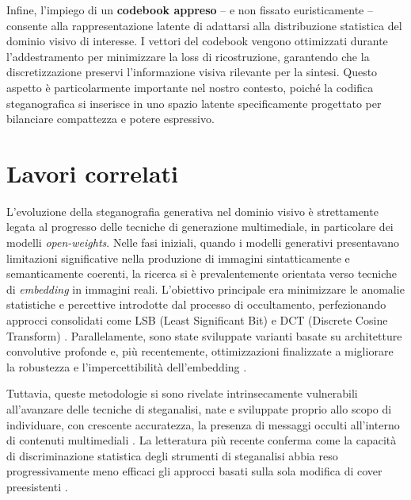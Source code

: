 Infine, l'impiego di un \textbf{codebook appreso} -- e non fissato euristicamente -- consente alla rappresentazione latente di adattarsi alla distribuzione statistica del dominio visivo di interesse. I vettori del codebook vengono ottimizzati durante l'addestramento per minimizzare la loss di ricostruzione, garantendo che la discretizzazione preservi l'informazione visiva rilevante per la sintesi. Questo aspetto è particolarmente importante nel nostro contesto, poiché la codifica steganografica si inserisce in uno spazio latente specificamente progettato per bilanciare compattezza e potere espressivo.


\section{Lavori correlati}

L'evoluzione della steganografia generativa nel dominio visivo è strettamente legata al progresso delle tecniche di generazione multimediale, in particolare dei modelli \emph{open-weights}. Nelle fasi iniziali, quando i modelli generativi presentavano limitazioni significative nella produzione di immagini sintatticamente e semanticamente coerenti, la ricerca si è prevalentemente orientata verso tecniche di \emph{embedding} in immagini reali. L'obiettivo principale era minimizzare le anomalie statistiche e percettive introdotte dal processo di occultamento, perfezionando approcci consolidati come LSB (Least Significant Bit) e DCT (Discrete Cosine Transform) \cite{baluja-2017}. Parallelamente, sono state sviluppate varianti basate su architetture convolutive profonde \cite{hu-2018, wu-2018} e, più recentemente, ottimizzazioni finalizzate a migliorare la robustezza e l'impercettibilità dell'embedding \cite{huang-2024, tan-2025, waheed-2024, wang-2025}.

Tuttavia, queste metodologie si sono rivelate intrinsecamente vulnerabili all'avanzare delle tecniche di steganalisi, nate e sviluppate proprio allo scopo di individuare, con crescente accuratezza, la presenza di messaggi occulti all'interno di contenuti multimediali \cite{chaumont-2019}. La letteratura più recente conferma come la capacità di discriminazione statistica degli strumenti di steganalisi abbia reso progressivamente meno efficaci gli approcci basati sulla sola modifica di cover preesistenti \cite{apau-2024}.

